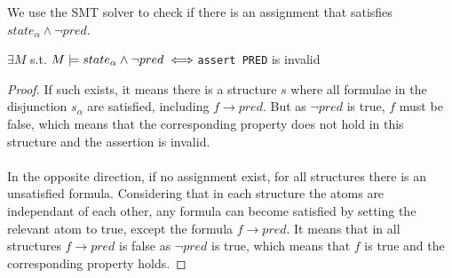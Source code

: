 We use the SMT solver to check if there is an assignment that satisfies $state_\alpha\land\neg pred$. 
\begin{theorem}
	$\exists M$ s.t. $M\models state_\alpha\land\neg pred \iff \normalfont$\texttt{assert PRED} is invalid 
\end{theorem}
\begin{proof}	
If such exists, it means there is a structure $s$ where all formulae in the disjunction $s_\alpha$ are satisfied, including $f\to pred$. But as $\neg pred$ is true, $f$ must be false, which means that the corresponding property does not hold in this structure and the assertion is invalid.\\ \\
In the opposite direction, if no assignment exist, for all structures there is an unsatisfied formula. Considering that in each structure the atoms are independant of each other, any formula can become satisfied by setting the relevant atom to true, except the formula $f\to pred$. It means that in all structures $f\to pred$ is false as $\neg pred$ is true, which means that $f$ is true and the corresponding property holds.
\end{proof}
